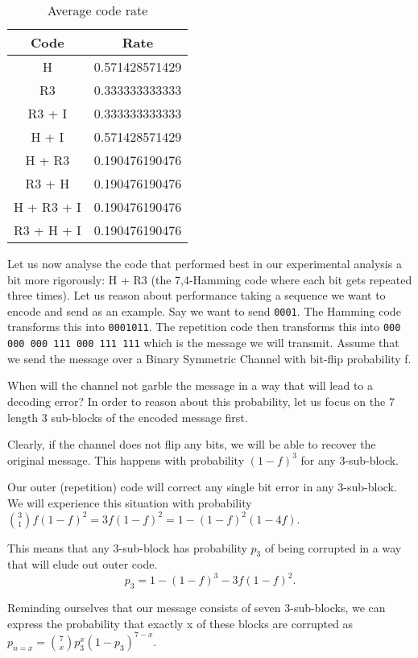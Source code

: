 \documentclass[10pt,a4paper,oneside,onecolumn]{article}
\begin{document}
\begin{table}[ht]
\centering
\begin{tabular}{| c | c |}
\hline
Code & Rate \\
\hline
H          & 0.571428571429 \\
R3         & 0.333333333333 \\
R3 + I     & 0.333333333333 \\
H + I      & 0.571428571429 \\
H + R3     & 0.190476190476 \\
R3 + H     & 0.190476190476 \\
H + R3 + I & 0.190476190476 \\
R3 + H + I & 0.190476190476 \\
\hline
\end{tabular}
\caption{Average code rate}
\label{tbl:code-rates}
\end{table}

Let us now analyse the code that performed best in our experimental analysis a
bit more rigorously: H + R3 (the 7,4-Hamming code where each bit gets repeated
three times). Let us reason about performance taking a sequence we want to
encode and send as an example. Say we want to send {\tt 0001}. The Hamming code
transforms this into {\tt 0001011}. The repetition code then transforms this
into {\tt 000 000 000 111 000 111 111} which is the message we will transmit.
Assume that we send the message over a Binary Symmetric Channel with bit-flip
probability f.

When will the channel not garble the message in a way that will lead to a
decoding error? In order to reason about this probability, let us focus on the 7
length 3 sub-blocks of the encoded message first.

Clearly, if the channel does not flip any bits, we will be able to recover the
original message. This happens with probability $(1-f)^3$ for any 3-sub-block.

Our outer (repetition) code will correct any single bit error in any
3-sub-block. We will experience this situation with probability ${3 \choose 1}
f(1-f)^2 = 3f(1-f)^2 = 1 - (1-f)^2(1 - 4f)$.

This means that any 3-sub-block has probability $p_3$ of being corrupted in a
way that will elude out outer code.
\begin{equation}
p_3 = 1 - (1-f)^3 - 3f(1-f)^2.
\end{equation}

Reminding ourselves that our message consists of seven 3-sub-blocks, we can
express the probability that exactly x of these blocks are corrupted as
$p_{n=x} = {7 \choose x} p_3^x(1-p_3)^{7-x}$.
\end{document}
